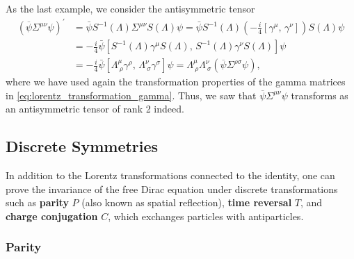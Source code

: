 As the last example, we consider the antisymmetric tensor
\[
    \begin{aligned}
        (\overline{\psi} \Sigma^{\mu \nu} \psi)^{\prime} & = \bar{\psi} S^{-1}(\Lambda) \Sigma^{\mu \nu} S(\Lambda) \psi = \bar{\psi} S^{-1}(\Lambda) \left( -\frac{i}{4} \left[\gamma^{\mu},\,\gamma^{\nu}\right]\right) S(\Lambda) \psi                                               \\
                                                         & = -\frac{i}{4} \bar{\psi} \left[ S^{-1}(\Lambda) \gamma^{\mu} S(\Lambda),\, S^{-1}(\Lambda) \gamma^{\nu} S(\Lambda)\right] \psi                                                                                              \\
                                                         & = -\frac{i}{4} \bar{\psi} \left[ \Lambda^{\mu}_{\ \rho} \gamma^{\rho},\, \Lambda^{\nu}_{\ \sigma} \gamma^{\sigma}\right] \psi = \Lambda^{\mu}_{\ \rho} \Lambda^{\nu}_{\ \sigma} (\overline{\psi} \Sigma^{\rho \sigma} \psi),
    \end{aligned}
\]
where we have used again the transformation properties of the gamma matrices in \eqref{eq:lorentz_transformation_gamma}. Thus, we saw that \(\overline{\psi} \Sigma^{\mu \nu} \psi\) transforms as an antisymmetric tensor of rank 2 indeed.

\subsection{Discrete Symmetries}

In addition to the Lorentz transformations connected to the identity, one can prove the invariance of the free Dirac equation under discrete transformations such as \textbf{parity} \(P\) (also known as spatial reflection), \textbf{time reversal} \(T\), and \textbf{charge conjugation} \(C\), which exchanges particles with antiparticles.

\subsubsection{Parity}

